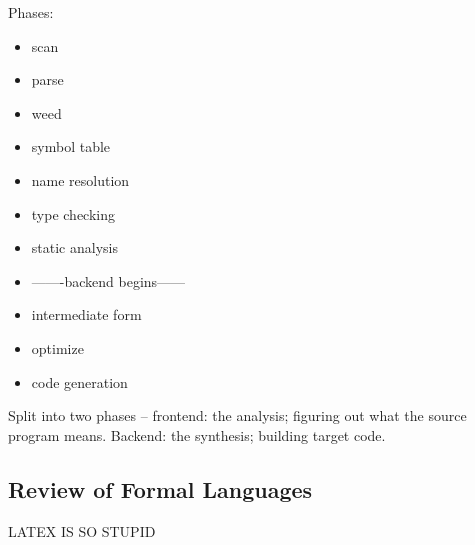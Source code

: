 \documentclass[12pt]{article}
\begin{document}
Phases:
\begin{itemize}
    \item scan
    \item parse
    \item weed
    \item symbol table
    \item name resolution
    \item type checking
    \item static analysis
    \item -------backend begins------
    \item intermediate form
    \item optimize
    \item code generation
\end{itemize}

Split into two phases -- frontend: the analysis; figuring out what the source program means. Backend: the synthesis;
building target code.


\subsection{Review of Formal Languages}
LATEX IS SO STUPID
\end{document}
